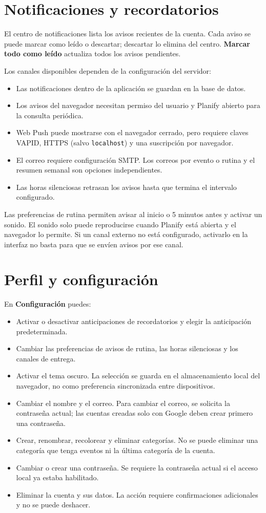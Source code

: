 \documentclass[12pt,a4paper]{article}
\begin{document}
\section{Notificaciones y recordatorios}
El centro de notificaciones lista los avisos recientes de la cuenta. Cada aviso se puede marcar como leído o descartar; descartar lo elimina del centro. \textbf{Marcar todo como leído} actualiza todos los avisos pendientes.

Los canales disponibles dependen de la configuración del servidor:
\begin{itemize}
  \item Las notificaciones dentro de la aplicación se guardan en la base de datos.
  \item Los avisos del navegador necesitan permiso del usuario y Planify abierto para la consulta periódica.
  \item Web Push puede mostrarse con el navegador cerrado, pero requiere claves VAPID, HTTPS (salvo \texttt{localhost}) y una suscripción por navegador.
  \item El correo requiere configuración SMTP. Los correos por evento o rutina y el resumen semanal son opciones independientes.
  \item Las horas silenciosas retrasan los avisos hasta que termina el intervalo configurado.
\end{itemize}
Las preferencias de rutina permiten avisar al inicio o 5 minutos antes y activar un sonido. El sonido solo puede reproducirse cuando Planify está abierta y el navegador lo permite. Si un canal externo no está configurado, activarlo en la interfaz no basta para que se envíen avisos por ese canal.

\section{Perfil y configuración}
En \textbf{Configuración} puedes:
\begin{itemize}
  \item Activar o desactivar anticipaciones de recordatorios y elegir la anticipación predeterminada.
  \item Cambiar las preferencias de avisos de rutina, las horas silenciosas y los canales de entrega.
  \item Activar el tema oscuro. La selección se guarda en el almacenamiento local del navegador, no como preferencia sincronizada entre dispositivos.
  \item Cambiar el nombre y el correo. Para cambiar el correo, se solicita la contraseña actual; las cuentas creadas solo con Google deben crear primero una contraseña.
  \item Crear, renombrar, recolorear y eliminar categorías. No se puede eliminar una categoría que tenga eventos ni la última categoría de la cuenta.
  \item Cambiar o crear una contraseña. Se requiere la contraseña actual si el acceso local ya estaba habilitado.
  \item Eliminar la cuenta y sus datos. La acción requiere confirmaciones adicionales y no se puede deshacer.
\end{itemize}
\end{document}
